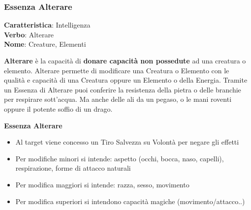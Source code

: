 \documentclass[a4paper,10 pt,twoside,openany]{book}
\begin{document}
\pagebreak

\subsubsection{Essenza Alterare}

\textbf{Caratteristica}: Intelligenza\\
\textbf{Verbo}: Alterare\\
\textbf{Nome}: Creature, Elementi\\

\label{essenza-alterare---intelletto}

\textbf{Alterare} è la capacità di \textbf{donare capacità non possedute} ad una creatura o elemento.
Alterare permette di modificare una Creatura o Elemento con le qualità e capacità di una Creatura oppure un Elemento o della Energia.
Tramite un Essenza di Alterare puoi conferire la resistenza della pietra o delle branchie per   respirare sott'acqua.
Ma anche delle ali da un pegaso, o le mani roventi oppure il potente soffio di un drago.

\bigskip

\textbf{Essenza Alterare}
\begin{itemize}
	\item
	Al target viene concesso un Tiro Salvezza su Volontà per negare gli effetti
	\item
	Per modifiche minori si intende: aspetto (occhi, bocca, naso, capelli), respirazione, forme di attacco naturali
	\item
	Per modifica maggiori si intende: razza, sesso, movimento
	\item
	Per modifica superiori si intendono capacità magiche (movimento/attacco..)
\end{itemize}

\bigskip
\end{document}
